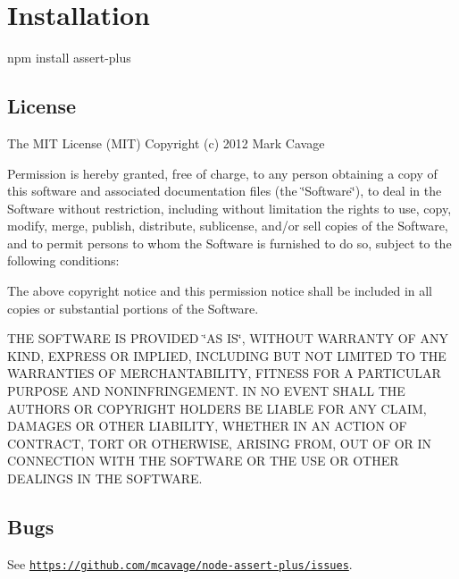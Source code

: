 \section*{Installation}

\begin{DoxyVerb}npm install assert-plus
\end{DoxyVerb}


\subsection*{License}

The M\+I\+T License (M\+I\+T) Copyright (c) 2012 Mark Cavage

Permission is hereby granted, free of charge, to any person obtaining a copy of this software and associated documentation files (the \char`\"{}\+Software\char`\"{}), to deal in the Software without restriction, including without limitation the rights to use, copy, modify, merge, publish, distribute, sublicense, and/or sell copies of the Software, and to permit persons to whom the Software is furnished to do so, subject to the following conditions\+:

The above copyright notice and this permission notice shall be included in all copies or substantial portions of the Software.

T\+H\+E S\+O\+F\+T\+W\+A\+R\+E I\+S P\+R\+O\+V\+I\+D\+E\+D \char`\"{}\+A\+S I\+S\char`\"{}, W\+I\+T\+H\+O\+U\+T W\+A\+R\+R\+A\+N\+T\+Y O\+F A\+N\+Y K\+I\+N\+D, E\+X\+P\+R\+E\+S\+S O\+R I\+M\+P\+L\+I\+E\+D, I\+N\+C\+L\+U\+D\+I\+N\+G B\+U\+T N\+O\+T L\+I\+M\+I\+T\+E\+D T\+O T\+H\+E W\+A\+R\+R\+A\+N\+T\+I\+E\+S O\+F M\+E\+R\+C\+H\+A\+N\+T\+A\+B\+I\+L\+I\+T\+Y, F\+I\+T\+N\+E\+S\+S F\+O\+R A P\+A\+R\+T\+I\+C\+U\+L\+A\+R P\+U\+R\+P\+O\+S\+E A\+N\+D N\+O\+N\+I\+N\+F\+R\+I\+N\+G\+E\+M\+E\+N\+T. I\+N N\+O E\+V\+E\+N\+T S\+H\+A\+L\+L T\+H\+E A\+U\+T\+H\+O\+R\+S O\+R C\+O\+P\+Y\+R\+I\+G\+H\+T H\+O\+L\+D\+E\+R\+S B\+E L\+I\+A\+B\+L\+E F\+O\+R A\+N\+Y C\+L\+A\+I\+M, D\+A\+M\+A\+G\+E\+S O\+R O\+T\+H\+E\+R L\+I\+A\+B\+I\+L\+I\+T\+Y, W\+H\+E\+T\+H\+E\+R I\+N A\+N A\+C\+T\+I\+O\+N O\+F C\+O\+N\+T\+R\+A\+C\+T, T\+O\+R\+T O\+R O\+T\+H\+E\+R\+W\+I\+S\+E, A\+R\+I\+S\+I\+N\+G F\+R\+O\+M, O\+U\+T O\+F O\+R I\+N C\+O\+N\+N\+E\+C\+T\+I\+O\+N W\+I\+T\+H T\+H\+E S\+O\+F\+T\+W\+A\+R\+E O\+R T\+H\+E U\+S\+E O\+R O\+T\+H\+E\+R D\+E\+A\+L\+I\+N\+G\+S I\+N T\+H\+E S\+O\+F\+T\+W\+A\+R\+E.

\subsection*{Bugs}

See \href{https://github.com/mcavage/node-assert-plus/issues}{\tt https\+://github.\+com/mcavage/node-\/assert-\/plus/issues}. 